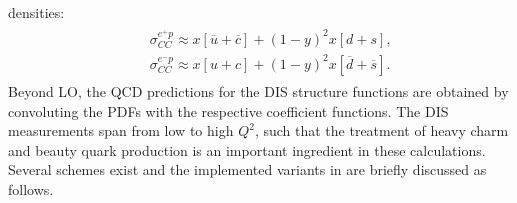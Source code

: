 densities:
\begin{eqnarray}
    \begin{array}{rll}
     & & \sigma_{CC}^{e^{+} p} \approx 
        x [\overline u + \overline c] + (1-y)^2 x [d+s], \\
     & & \sigma_{CC}^{e^{-} p} \approx 
        x[u+c] + (1-y)^2 x[\overline d + \overline s].
    \end{array}
\end{eqnarray}
%
Beyond LO, 
the QCD predictions for the DIS structure functions are obtained by convoluting 
the PDFs with the respective coefficient functions. The DIS measurements span from low to high $Q^2$, such that  
the treatment of heavy charm and beauty quark production is an important ingredient in these calculations. Several schemes exist and the implemented variants in \fitter are briefly discussed as follows.


